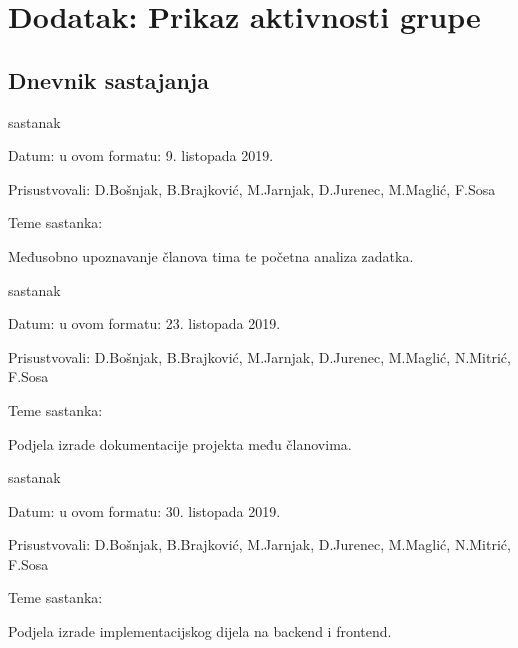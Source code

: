 \chapter*{Dodatak: Prikaz aktivnosti grupe}
		
		\section*{Dnevnik sastajanja}

		
		\begin{packed_enum}
			\item  sastanak
			
			\item[] \begin{packed_item}
				\item Datum: u ovom formatu: 9. listopada 2019.
				\item Prisustvovali: D.Bošnjak, B.Brajković, M.Jarnjak, D.Jurenec, M.Maglić, F.Sosa
				\item Teme sastanka:
				\begin{packed_item}
					\item  Međusobno upoznavanje članova tima te početna analiza zadatka.
				\end{packed_item}
			\end{packed_item}
			
			\item  sastanak
			\item[] \begin{packed_item}
				\item Datum: u ovom formatu: 23. listopada 2019.
				\item Prisustvovali: D.Bošnjak, B.Brajković, M.Jarnjak, D.Jurenec, M.Maglić, N.Mitrić, F.Sosa
				\item Teme sastanka:
				\begin{packed_item}
					\item  Podjela izrade dokumentacije projekta među članovima.
				\end{packed_item}
			\end{packed_item}
		
			\item  sastanak
			\item[] \begin{packed_item}
				\item Datum: u ovom formatu: 30. listopada 2019.
				\item Prisustvovali: D.Bošnjak, B.Brajković, M.Jarnjak, D.Jurenec, M.Maglić, N.Mitrić, F.Sosa
				\item Teme sastanka:
				\begin{packed_item}
					\item  Podjela izrade implementacijskog dijela na backend i frontend.
				\end{packed_item}
			\end{packed_item}
		

\end{packed_enum}
